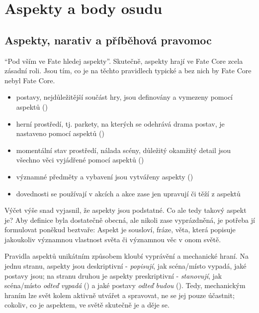 \documentclass[../main.tex]{subfiles}
\begin{document}
\chapter{Aspekty a body osudu}
\label{chap:aspekty}

\section{Aspekty, narativ a příběhová pravomoc}
\label{sec:aspekty-narativ-pribeh}

``Pod vším ve Fate hledej aspekty''. Skutečně, aspekty hrají ve Fate Core zcela zásadní roli. Jsou tím, co je na těchto pravidlech typické a bez nich by Fate Core nebyl Fate Core.

\begin{itemize}
\item postavy, nejdůležitější součást hry, jsou definovány a vymezeny pomocí aspektů ()
\item herní prostředí, tj. parkety, na kterých se odehrává drama postav, je nastaveno pomocí aspektů ()
\item momentální stav prostředí, nálada scény, důležitý okamžitý detail jsou všechno věci vyjádřené pomocí aspektů ()
\item významné předměty a vybavení jsou vytvářeny aspekty ()
\item dovednosti se používají v akcích a akce zase jen upravují či těží z aspektů
\end{itemize}

\begin{sloppypar}
Výčet výše snad vyjasnil, že aspekty jsou podstatné. Co ale tedy takový aspekt je? Aby definice byla dostatečně obecná, ale nikoli zase vyprázdněná, je potřeba jí formulovat poněkud beztvaře: Aspekt je sousloví, fráze, věta, která popisuje jakoukoliv významnou vlastnost světa či významnou věc v onom světě. 
\end{sloppypar}

Pravidla aspektů unikátním způsobem kloubí vyprávění a mechanické hraní. Na jednu stranu, aspekty jsou deskriptivní - \emph{popisují}, jak scéna/místo vypadá, jaké postavy jsou; na stranu druhou je aspekty preskriptivní - \emph{stanovují}, jak scéna/místo \emph{odteď vypadá} () a jaké postavy \emph{odteď budou} (). Tedy, mechanickým hraním lze svět kolem aktivně utvářet a spravovat, ne se jej pouze účastnit; cokoliv, co je aspektem, ve světě skutečně je a děje se. \\
\end{document}

